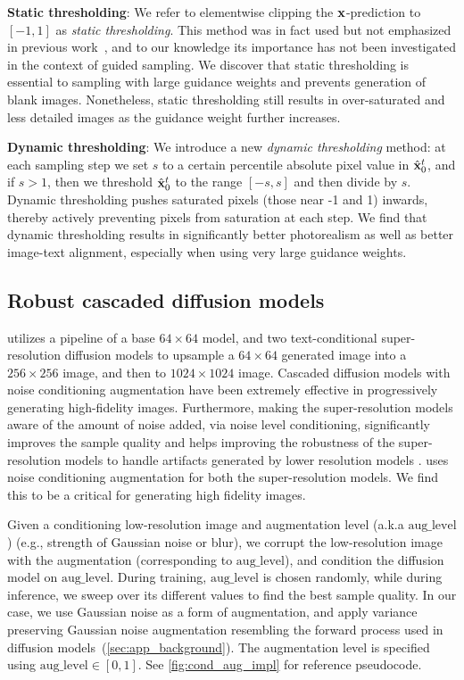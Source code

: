 \textbf{Static thresholding}: We refer to elementwise clipping the $\mathbf{x}$-prediction to $[-1, 1]$ as \emph{static thresholding}. This method was in fact used but not emphasized in previous work~\citep{ho2020denoising}, and to our knowledge its importance has not been investigated in the context of guided sampling. We discover that static thresholding is essential to sampling with large guidance weights and prevents generation of blank images. Nonetheless, static thresholding still results in over-saturated and less detailed images as the guidance weight further increases.

\textbf{Dynamic thresholding}: We introduce a new \emph{dynamic thresholding} method: at each sampling step we set $s$ to a certain percentile absolute pixel value in $\hat{\mathbf{x}}^t_0$, and if $s>1$, then we threshold $\hat{\mathbf{x}}^t_0$ to the range $[-s, s]$ and then divide by $s$. Dynamic thresholding pushes saturated pixels (those near -1 and 1) inwards, thereby actively preventing pixels from saturation at each step. We find that dynamic thresholding results in significantly better photorealism as well as better image-text alignment, especially when using very large guidance weights. 






\vspace{\presectionspace}
\subsection{Robust cascaded diffusion models}
\vspace{\postsectionspace}
\name utilizes a pipeline of a base $64\times64$ model, and two text-conditional super-resolution diffusion models to upsample a $64\times64$ generated image into a $256\times256$ image, and then to $1024\times1024$ image. Cascaded diffusion models with noise conditioning augmentation \citep{ho2021cascaded} have been extremely effective in progressively generating high-fidelity images. Furthermore, making the super-resolution models aware of the amount of noise added, via noise level conditioning, significantly improves the sample quality and helps improving the robustness of the super-resolution models to handle artifacts generated by lower resolution models \cite{ho2021cascaded}.
\name uses noise conditioning augmentation for both the super-resolution models. We find this to be a critical for generating high fidelity images.

Given a conditioning low-resolution image and augmentation level (a.k.a $\mathrm{aug\_level}$) (e.g., strength of Gaussian noise or blur), we corrupt the low-resolution image with the augmentation (corresponding to $\mathrm{aug\_level}$), and condition the diffusion model on $\mathrm{aug\_level}$. During training, $\mathrm{aug\_level}$ is chosen randomly, while during inference, we sweep over its different values to find the best sample quality. In our case, we use Gaussian noise as a form of augmentation, and apply variance preserving Gaussian noise augmentation resembling the forward process used in diffusion models~(\cref{sec:app_background}). The augmentation level is specified using $\mathrm{aug\_level} \in [0, 1]$. See \cref{fig:cond_aug_impl} for reference pseudocode.


